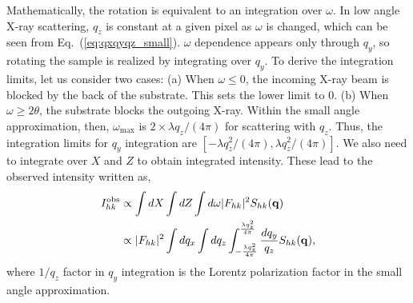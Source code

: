Mathematically, the rotation is  
equivalent to an integration over $\omega$. In low angle X-ray scattering, 
$q_z$ is constant at a given pixel as $\omega$ is changed, which can be seen from 
Eq.~(\ref{eq:qxqyqz_small}). $\omega$ dependence appears only through $q_y$, 
so rotating the sample is realized by integrating over $q_y$. 
To derive the integration limits, let us consider two cases: (a) When $\omega \leq 0$,
the incoming X-ray beam is blocked by the back of the substrate. This sets 
the lower limit to 0. (b) When $\omega \geq 2\theta$, the substrate blocks 
the outgoing X-ray. Within the small angle approximation, then, $\omega_{\text{max}}$
is $2\times \lambda q_z/(4\pi)$ for scattering with $q_z$. 
Thus, the integration limits 
for $q_y$ integration are $[-\lambda q_z^2/(4\pi), \lambda q_z^2/(4\pi)]$.
We also need to integrate over $X$ and $Z$ to obtain integrated intensity. 
These lead to the observed intensity
written as,
\begin{align}
  I_{hk}^\mathrm{obs} 
    &\propto \int dX \int dZ \int d\omega |F_{hk}|^2 S_{hk}(\mathbf{q}) \nonumber \\
    &\propto |F_{hk}|^2 \int dq_x \int dq_z 
             \int_{-\frac{\lambda q_z^2}{4\pi}}^{\frac{\lambda q_z^2}{4\pi}} 
             \frac{dq_y}{q_z} 
             S_{hk}(\mathbf{q}),
\end{align}
where $1/q_z$ factor in $q_y$ integration is the Lorentz polarization factor
in the small angle approximation. 

